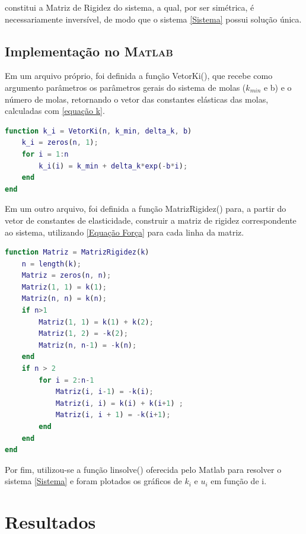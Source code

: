 \documentclass[12pt,a4paper]{article}
\newcommand{\MATLAB}{\textsc{Matlab}}
\begin{document}
\vspace{0.5\baselineskip}

\noindent constitui a Matriz de Rigidez do sistema, a qual, por ser simétrica, é necessariamente inversível, de modo que o sistema \eqref{Sistema} possui solução única.

\vspace{0.5\baselineskip}

\subsection{Implementação no \MATLAB}

\par Em um arquivo próprio, foi definida a função VetorKi(), que recebe como argumento parâmetros os parâmetros gerais do sistema de molas ($k_{min}$ e b) e o número de molas, retornando o vetor das constantes elásticas das molas, calculadas com \eqref{equação k}.

\begin{lstlisting}[language=Matlab, 
caption = {Função para criação do vetor de constantes elásticas.},
label = {lst:funcao_ki}]
function k_i = VetorKi(n, k_min, delta_k, b)
    k_i = zeros(n, 1);
    for i = 1:n
        k_i(i) = k_min + delta_k*exp(-b*i);
    end
end
\end{lstlisting}

\par Em um outro arquivo, foi definida a função MatrizRigidez() para, a partir do vetor de constantes de elasticidade, construir a matriz de rigidez correspondente ao sistema, utilizando \eqref{Equação Força} para cada linha da matriz.
\begin{lstlisting}[language=Matlab, 
caption = {Função para criação da matriz de rigidez},
label = {lst:funcao_matriz}]
function Matriz = MatrizRigidez(k)
    n = length(k);
    Matriz = zeros(n, n);
    Matriz(1, 1) = k(1);
    Matriz(n, n) = k(n);
    if n>1
        Matriz(1, 1) = k(1) + k(2);
        Matriz(1, 2) = -k(2);
        Matriz(n, n-1) = -k(n);
    end
    if n > 2
        for i = 2:n-1
            Matriz(i, i-1) = -k(i);
            Matriz(i, i) = k(i) + k(i+1) ;
            Matriz(i, i + 1) = -k(i+1);
        end
    end
end
\end{lstlisting}
\par Por fim, utilizou-se a função linsolve() oferecida pelo Matlab para resolver o sistema \eqref{Sistema} e foram plotados os gráficos de $k_i$ e $u_i$ em função de i.
\section{Resultados}
\end{document}

